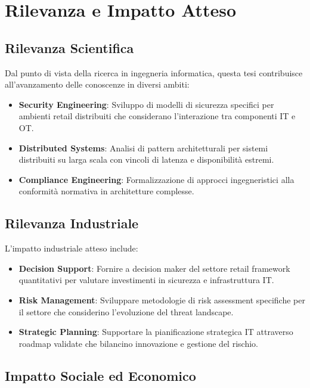 \documentclass[12pt,a4paper,oneside]{book}
\begin{document}
\section{Rilevanza e Impatto Atteso}
\label{sec:rilevanza}

\subsection{Rilevanza Scientifica}
\label{ssec:rilevanza_scientifica}

Dal punto di vista della ricerca in ingegneria informatica, questa tesi contribuisce all'avanzamento delle conoscenze in diversi ambiti:
\begin{itemize}
    \item \textbf{Security Engineering}: Sviluppo di modelli di sicurezza specifici per ambienti retail distribuiti che considerano l'interazione tra componenti IT e OT.
    \item \textbf{Distributed Systems}: Analisi di pattern architetturali per sistemi distribuiti su larga scala con vincoli di latenza e disponibilità estremi.
    \item \textbf{Compliance Engineering}: Formalizzazione di approcci ingegneristici alla conformità normativa in architetture complesse.
\end{itemize}

\subsection{Rilevanza Industriale}
\label{ssec:rilevanza_industriale}

L'impatto industriale atteso include:
\begin{itemize}
    \item \textbf{Decision Support}: Fornire a decision maker del settore retail framework quantitativi per valutare investimenti in sicurezza e infrastruttura IT.
    \item \textbf{Risk Management}: Sviluppare metodologie di risk assessment specifiche per il settore che considerino l'evoluzione del threat landscape.
    \item \textbf{Strategic Planning}: Supportare la pianificazione strategica IT attraverso roadmap validate che bilancino innovazione e gestione del rischio.
\end{itemize}

\subsection{Impatto Sociale ed Economico}
\label{ssec:impatto_sociale}
\end{document}
